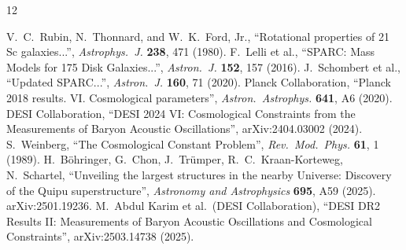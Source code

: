 \documentclass[11pt, twoside]{article}
\begin{document}

\begin{thebibliography}{12}
\raggedright
{} V.~C.~Rubin, N.~Thonnard, and W.~K.~Ford, Jr., ``Rotational properties of 21 Sc galaxies...'', \textit{Astrophys.\ J.} \textbf{238}, 471 (1980).
 F.~Lelli et al., ``SPARC: Mass Models for 175 Disk Galaxies...'', \textit{Astron.\ J.} \textbf{152}, 157 (2016).
 J.~Schombert et al., ``Updated SPARC...'', \textit{Astron.\ J.} \textbf{160}, 71 (2020).
 Planck Collaboration, ``Planck 2018 results. VI. Cosmological parameters'', \textit{Astron.\ Astrophys.} \textbf{641}, A6 (2020).
 DESI Collaboration, ``DESI 2024 VI: Cosmological Constraints from the Measurements of Baryon Acoustic Oscillations'', arXiv:2404.03002 (2024).
 S.~Weinberg, ``The Cosmological Constant Problem'', \textit{Rev.\ Mod.\ Phys.} \textbf{61}, 1 (1989).
H.~B{\"o}hringer, G.~Chon, J.~Tr{\"u}mper, R.~C.~Kraan-Korteweg, N.~Schartel,
``Unveiling the largest structures in the nearby Universe: Discovery of the Quipu superstructure'',
\textit{Astronomy and Astrophysics} \textbf{695}, A59 (2025). arXiv:2501.19236.
M.~Abdul Karim et al.\ (DESI Collaboration),
``DESI DR2 Results II: Measurements of Baryon Acoustic Oscillations and Cosmological Constraints'',
arXiv:2503.14738 (2025).
\end{thebibliography}
\end{document}
